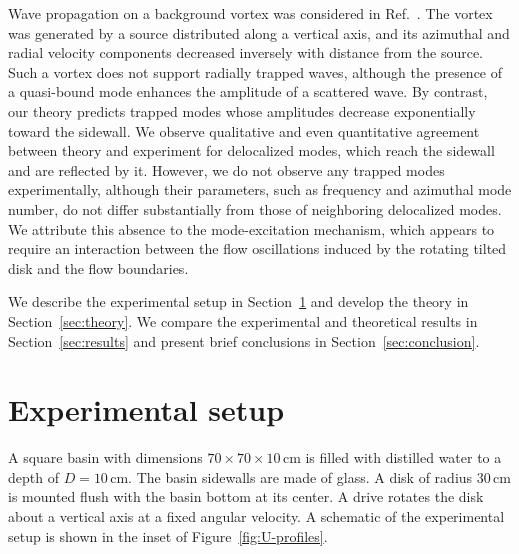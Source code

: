 \documentclass[aps,twocolumn]{revtex4-2}
\begin{document}
Wave propagation on a background vortex was considered in Ref.~\cite{torres2018waves}. The vortex was generated by a source distributed along a vertical axis, and its azimuthal and radial velocity components decreased inversely with distance from the source. Such a vortex does not support radially trapped waves, although the presence of a quasi-bound mode enhances the amplitude of a scattered wave. By contrast, our theory predicts trapped modes whose amplitudes decrease exponentially toward the sidewall. We observe qualitative and even quantitative agreement between theory and experiment for delocalized modes, which reach the sidewall and are reflected by it. However, we do not observe any trapped modes experimentally, although their parameters, such as frequency and azimuthal mode number, do not differ substantially from those of neighboring delocalized modes. We attribute this absence to the mode-excitation mechanism, which appears to require an interaction between the flow oscillations induced by the rotating tilted disk and the flow boundaries.

We describe the experimental setup in Section~\ref{sec:experimental-setup} and develop the theory in Section~\ref{sec:theory}. We compare the experimental and theoretical results in Section~\ref{sec:results} and present brief conclusions in Section~\ref{sec:conclusion}.



\section{Experimental setup}
\label{sec:experimental-setup}

A square basin with dimensions $70\times 70 \times 10\,\text{cm}$ is filled with distilled water to a depth of $D = 10\,\text{cm}$. The basin sidewalls are made of glass. A disk of radius $30\,\text{cm}$ is mounted flush with the basin bottom at its center. A drive rotates the disk about a vertical axis at a fixed angular velocity. A schematic of the experimental setup is shown in the inset of Figure~\ref{fig:U-profiles}.
\end{document}

